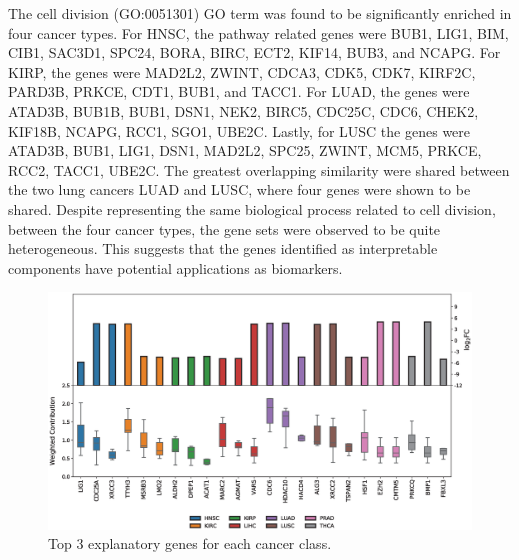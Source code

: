The cell division (GO:0051301) GO term was found to be significantly enriched in four cancer types. For HNSC, the pathway related genes were BUB1, LIG1, BIM, CIB1, SAC3D1, SPC24, BORA, BIRC, ECT2, KIF14, BUB3, and NCAPG. For KIRP, the genes were MAD2L2, ZWINT, CDCA3, CDK5, CDK7, KIRF2C, PARD3B, PRKCE, CDT1, BUB1, and TACC1. For LUAD, the genes were ATAD3B, BUB1B, BUB1, DSN1, NEK2, BIRC5, CDC25C, CDC6, CHEK2, KIF18B, NCAPG, RCC1, SGO1, UBE2C. Lastly, for LUSC the genes were ATAD3B, BUB1, LIG1, DSN1, MAD2L2, SPC25, ZWINT, MCM5, PRKCE, RCC2, TACC1, UBE2C. The greatest overlapping similarity were shared between the two lung cancers LUAD and LUSC, where four genes were shown to be shared. Despite representing the same biological process related to cell division, between the four cancer types, the gene sets were observed to be quite heterogeneous. This suggests that the genes identified as interpretable components have potential applications as biomarkers.

\begin{figure}[h!]
    \centering
    \includegraphics[width=\textwidth]{img/top3gene2.eps}
    \caption{Top 3 explanatory genes for each cancer class.}
    \label{fig:top3gene}
\end{figure}

